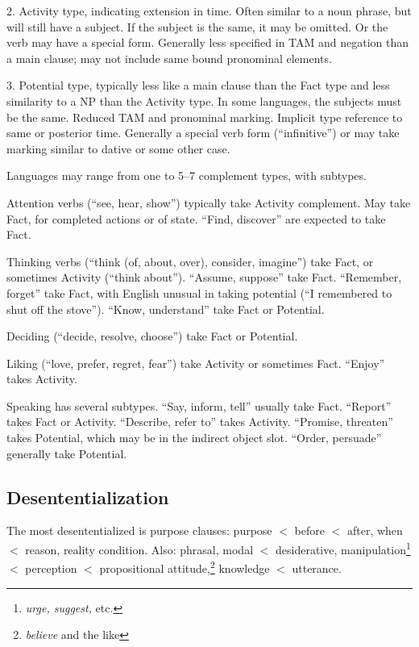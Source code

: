 \documentclass[11pt]{article}
\begin{document}
2. Activity type, indicating extension in time.  Often similar to a
noun phrase, but will still have a subject.  If the subject is the
same, it may be omitted.  Or the verb may have a special form.
Generally less specified in TAM and negation than a main clause; may
not include same bound pronominal elements.

3. Potential type, typically less like a main clause than the Fact
type and less similarity to a NP than the Activity type.  In some
languages, the subjects must be the same.  Reduced TAM and pronominal
marking.  Implicit type reference to same or posterior time.
Generally a special verb form (``infinitive'') or may take marking
similar to dative or some other case.

Languages may range from one to 5--7 complement types, with subtypes.

Attention verbs (``see, hear, show'') typically take Activity
complement.  May take Fact, for completed actions or of state.
``Find, discover'' are expected to take Fact.

Thinking verbs (``think (of, about, over), consider, imagine'') take
Fact, or sometimes Activity (``think about'').  ``Assume, suppose''
take Fact.  ``Remember, forget'' take Fact, with English unusual in
taking potential (``I remembered to shut off the stove'').  ``Know,
understand'' take Fact or Potential.

Deciding (``decide, resolve, choose'') take Fact or Potential.

Liking (``love, prefer, regret, fear'') take Activity or sometimes
Fact.  ``Enjoy'' takes Activity.

Speaking has several subtypes.  ``Say, inform, tell'' usually take
Fact.  ``Report'' takes Fact or Activity.  ``Describe, refer to''
takes Activity.  ``Promise, threaten'' takes Potential, which may be
in the indirect object slot.  ``Order, persuade'' generally take
Potential. 

\subsection{Desententialization}
The most desententialized is purpose clauses: purpose $<$ before $<$
after, when $<$ reason, reality condition.  Also: phrasal, modal $<$
desiderative, manipulation\footnote{\textit{urge, suggest,} etc.} $<$
perception $<$ propositional attitude,\footnote{\textit{believe} and
the like} knowledge $<$ utterance.

\end{document}
